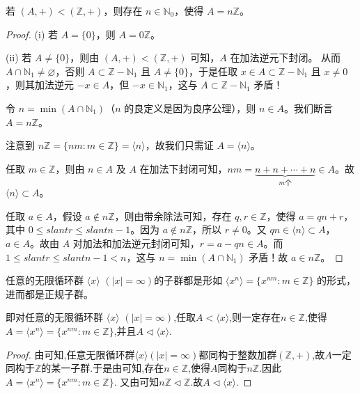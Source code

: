 \documentclass[../../main.tex]{subfiles}
\begin{document}
\begin{proposition}\label{proposition:Z的任意子群都形如nZ}
若 $(A, +)<(\mathbb{Z}, +)$，则存在 $n\in\mathbb{N}_0$，使得 $A = n\mathbb{Z}$。
\end{proposition}
\begin{proof}
(i) 若 $A = \{0\}$，则 $A = 0\mathbb{Z}$。

(ii) 若 $A\neq\{0\}$，则由 $(A, +)<(\mathbb{Z}, +)$ 可知，$A$ 在加法逆元下封闭。
从而 $A\cap\mathbb{N}_1\neq\varnothing$，否则 $A\subset\mathbb{Z}-\mathbb{N}_1$ 且 $A\neq\{0\}$，于是任取 $x\in A\subset\mathbb{Z}-\mathbb{N}_1$ 且 $x\neq 0$，则其加法逆元 $-x\in A$，但 $-x\in\mathbb{N}_1$，这与 $A\subset\mathbb{Z}-\mathbb{N}_1$ 矛盾！

令 $n = \min(A\cap\mathbb{N}_1)$（$n$ 的良定义是因为良序公理），则 $n\in A$。我们断言 $A = n\mathbb{Z}$。

注意到 $n\mathbb{Z}=\{nm:m\in\mathbb{Z}\}=\langle n\rangle$，故我们只需证 $A = \langle n\rangle$。

任取 $m\in\mathbb{Z}$，则由 $n\in A$ 及 $A$ 在加法下封闭可知，$nm=\underset{m\text{个}}{\underbrace{n + n+\cdots + n}}\in A$。故 $\langle n\rangle\subset A$。

任取 $a\in A$，假设 $a\notin n\mathbb{Z}$，则由带余除法可知，存在 $q,r\in\mathbb{Z}$，使得 $a = qn + r$，其中 $0\leqslant slant r\leqslant slant n - 1$。因为 $a\notin n\mathbb{Z}$，所以 $r\neq 0$。又 $qn\in\langle n\rangle\subset A$，$a\in A$。故由 $A$ 对加法和加法逆元封闭可知，$r = a - qn\in A$。而 $1\leqslant slant r\leqslant slant n - 1 < n$，这与 $n = \min(A\cap\mathbb{N}_1)$ 矛盾！故 $a\in n\mathbb{Z}$。 
\end{proof}

\begin{corollary}
任意的无限循环群 $\langle x\rangle$ $(|x|=\infty)$的子群都是形如 $\langle x^n\rangle=\{x^{nm}:m\in\mathbb{Z}\}$ 的形式，进而都是正规子群。
 
即对任意的无限循环群 $\langle x\rangle$ $(|x|=\infty)$,任取$A<\langle x\rangle$,则一定存在$n\in \mathbb{Z}$,使得$A=\langle x^n\rangle=\{x^{nm}:m\in\mathbb{Z}\}$,并且$A\lhd \langle x\rangle$.
\end{corollary}
\begin{proof}
由可知,任意无限循环群$\langle x\rangle(|x|=\infty)$都同构于整数加群$(\mathbb{Z},+)$,故$A$一定同构于$\mathbb{Z}$的某一子群.于是由可知,存在$n\in \mathbb{Z}$,使得$A$同构于$n \mathbb{Z}$.因此$A=\langle x^n\rangle=\{x^{nm}:m\in\mathbb{Z}\}$.
又由可知$n \mathbb{Z}\lhd \mathbb{Z}$.故$A\lhd \langle x\rangle$.
\end{proof}
\end{document}
